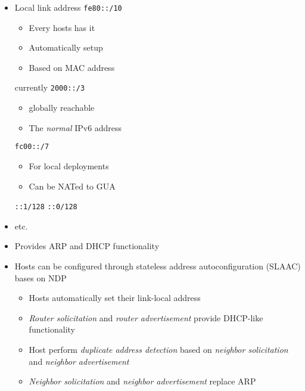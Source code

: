 \begin{itemize}
\begin{itemize}
            \item Local link address \verb+fe80::/10+
                \begin{itemize}
                    \item Every hosts has it
                    \item Automatically setup
                    \item Based on MAC address
                \end{itemize}
             currently \verb+2000::/3+
                \begin{itemize}
                    \item globally reachable
                    \item The \textit{normal} IPv6 address
                \end{itemize}
             \verb+fc00::/7+
                \begin{itemize}
                    \item For local deployments
                    \item Can be NATed to GUA
                \end{itemize}
             \verb+::1/128+
             \verb+::0/128+
            \item etc.
        \end{itemize}
        \begin{itemize}
            \item Provides ARP and DHCP functionality
            \item Hosts can be configured through stateless address autoconfiguration (SLAAC) bases on NDP
                \begin{itemize}
                    \item Hosts automatically set their link-local address
                    \item \textit{Router solicitation} and \textit{router advertisement} provide DHCP-like functionality
                    \item Host perform \textit{duplicate address detection} based on \textit{neighbor solicitation} and \textit{neighbor advertisement}
                    \item \textit{Neighbor solicitation} and \textit{neighbor advertisement} replace ARP
                \end{itemize}

\end{itemize}
\end{itemize}
